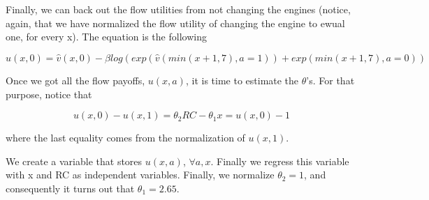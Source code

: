 \documentclass[12 pt]{article}
\begin{document}
Finally, we can back out the flow utilities from not changing the engines (notice, again, that we have normalized the flow utility of changing the engine to ewual one, for every x). The equation is the following

\begin{equation}
\hat{u}(x,0) = \hat{v}(x,0) - \beta log(exp(\hat{v}(min(x+1, 7), a=1)) + exp(min(x+1, 7), a=0))
\end{equation}

Once we got all the flow payoffs, $u(x,a)$, it is time to estimate the $\theta$'s. For that purpose, notice that

$$ u(x, 0) - u(x, 1) = \theta_2 RC - \theta_1 x = u(x, 0) - 1$$

where the last equality comes from the normalization of $u(x, 1)$.

We create a variable that stores $u(x,a)$, $\forall a, x$. Finally we regress this variable with x and RC as independent variables. Finally, we normalize $\theta_2=1$, and consequently it turns out that $\theta_1=2.65$.
\end{document}
